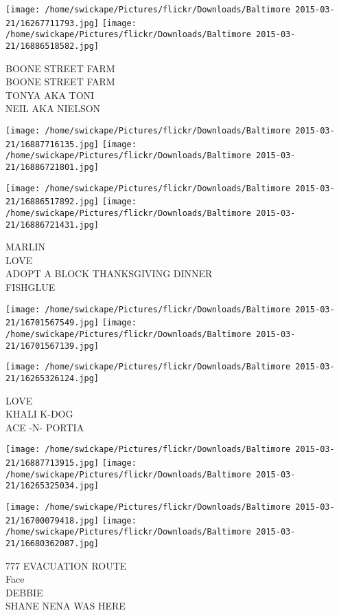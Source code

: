 \documentclass[10pt,letterpaper]{article}
\begin{document}
\texttt{[image: /home/swickape/Pictures/flickr/Downloads/Baltimore 2015-03-21/16267711793.jpg]}
\texttt{[image: /home/swickape/Pictures/flickr/Downloads/Baltimore 2015-03-21/16886518582.jpg]}

BOONE STREET FARM\\
BOONE STREET FARM\\
TONYA AKA TONI\\
NEIL AKA NIELSON
\pagebreak

\texttt{[image: /home/swickape/Pictures/flickr/Downloads/Baltimore 2015-03-21/16887716135.jpg]}
\texttt{[image: /home/swickape/Pictures/flickr/Downloads/Baltimore 2015-03-21/16886721801.jpg]}

\texttt{[image: /home/swickape/Pictures/flickr/Downloads/Baltimore 2015-03-21/16886517892.jpg]}
\texttt{[image: /home/swickape/Pictures/flickr/Downloads/Baltimore 2015-03-21/16886721431.jpg]}

MARLIN\\
LOVE\\
ADOPT A BLOCK THANKSGIVING DINNER\\
FISHGLUE
\pagebreak

\texttt{[image: /home/swickape/Pictures/flickr/Downloads/Baltimore 2015-03-21/16701567549.jpg]}
\texttt{[image: /home/swickape/Pictures/flickr/Downloads/Baltimore 2015-03-21/16701567139.jpg]}

\vspace{0.25in}
\texttt{[image: /home/swickape/Pictures/flickr/Downloads/Baltimore 2015-03-21/16265326124.jpg]}

LOVE\\
KHALI K{-}DOG\\
ACE {-}N{-} PORTIA
\pagebreak

\texttt{[image: /home/swickape/Pictures/flickr/Downloads/Baltimore 2015-03-21/16887713915.jpg]}
\texttt{[image: /home/swickape/Pictures/flickr/Downloads/Baltimore 2015-03-21/16265325034.jpg]}

\texttt{[image: /home/swickape/Pictures/flickr/Downloads/Baltimore 2015-03-21/16700079418.jpg]}
\texttt{[image: /home/swickape/Pictures/flickr/Downloads/Baltimore 2015-03-21/16680362087.jpg]}

777 EVACUATION ROUTE\\
Face\\
DEBBIE\\
SHANE NENA WAS HERE
\pagebreak
\end{document}
